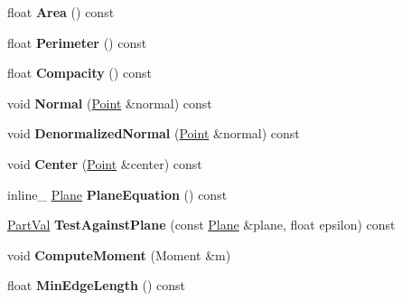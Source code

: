 \begin{DoxyCompactItemize}
\item 
float {\bfseries Area} () const \hypertarget{classTriangle_ad3885c40e78c33327a622351dbb07ed7}{}\label{classTriangle_ad3885c40e78c33327a622351dbb07ed7}

\item 
float {\bfseries Perimeter} () const \hypertarget{classTriangle_a599d3355adcfa507458f8c59127162e7}{}\label{classTriangle_a599d3355adcfa507458f8c59127162e7}

\item 
float {\bfseries Compacity} () const \hypertarget{classTriangle_af797cac6e93b15df3ff798e66caaeca1}{}\label{classTriangle_af797cac6e93b15df3ff798e66caaeca1}

\item 
void {\bfseries Normal} (\hyperlink{classPoint}{Point} \&normal) const \hypertarget{classTriangle_a5a58c9b3d52e65ba3c6bc45a01daa006}{}\label{classTriangle_a5a58c9b3d52e65ba3c6bc45a01daa006}

\item 
void {\bfseries Denormalized\+Normal} (\hyperlink{classPoint}{Point} \&normal) const \hypertarget{classTriangle_ab3f35b42fe3eda2a5cb24ecb9352327a}{}\label{classTriangle_ab3f35b42fe3eda2a5cb24ecb9352327a}

\item 
void {\bfseries Center} (\hyperlink{classPoint}{Point} \&center) const \hypertarget{classTriangle_ab12266ad0b45dfcdb90f73864324c610}{}\label{classTriangle_ab12266ad0b45dfcdb90f73864324c610}

\item 
inline\+\_\+ \hyperlink{classPlane}{Plane} {\bfseries Plane\+Equation} () const \hypertarget{classTriangle_a5fd363cf7a18893fd8e9a9725a51b6bf}{}\label{classTriangle_a5fd363cf7a18893fd8e9a9725a51b6bf}

\item 
\hyperlink{IceTriangle_8h_a996b8c795aeae8a7613008c9300751ea}{Part\+Val} {\bfseries Test\+Against\+Plane} (const \hyperlink{classPlane}{Plane} \&plane, float epsilon) const \hypertarget{classTriangle_a576c2439b17d2df127a309d455da88c2}{}\label{classTriangle_a576c2439b17d2df127a309d455da88c2}

\item 
void {\bfseries Compute\+Moment} (Moment \&m)\hypertarget{classTriangle_a0ff6ad4b924743fad9d16b7b29847d75}{}\label{classTriangle_a0ff6ad4b924743fad9d16b7b29847d75}

\item 
float {\bfseries Min\+Edge\+Length} () const \hypertarget{classTriangle_a013363d89cadfbaa44584c2d4514283a}{}\label{classTriangle_a013363d89cadfbaa44584c2d4514283a}


\end{DoxyCompactItemize}
